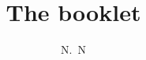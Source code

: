\documentclass[12pt]{article}
\author{N.~N}
\title{The booklet}
\begin{document}
\newcommand{\hlod}[1]{\par{}#1}

\maketitle


\end{document}
